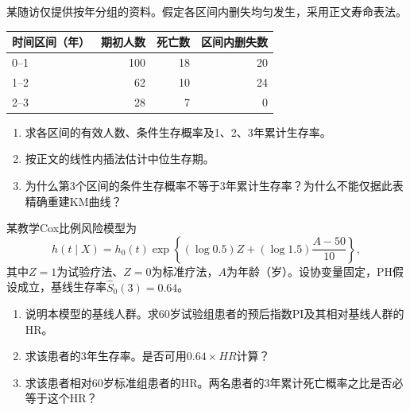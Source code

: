 \par\addvspace{8pt}\noindent\begin{minipage}{\linewidth}


某随访仅提供按年分组的资料。假定各区间内删失均匀发生，采用正文寿命表法。
\begin{center}\begin{tabular}{lrrr}\toprule
时间区间（年） & 期初人数 & 死亡数 & 区间内删失数\\\midrule
0--1 & 100 & 18 & 20\\
1--2 & 62 & 10 & 24\\
2--3 & 28 & 7 & 0\\\bottomrule
\end{tabular}\end{center}
\begin{enumerate}
\item 求各区间的有效人数、条件生存概率及1、2、3年累计生存率。
\item 按正文的线性内插法估计中位生存期。
\item 为什么第3个区间的条件生存概率不等于3年累计生存率？为什么不能仅据此表精确重建KM曲线？
\end{enumerate}


\end{minipage}\par\vspace{5pt}

\par\addvspace{8pt}\noindent\begin{minipage}{\linewidth}


某教学Cox比例风险模型为
\[h(t\mid X)=h_0(t)\exp\left\{(\log0.5)Z+(\log1.5)\frac{A-50}{10}\right\},\]
其中\(Z=1\)为试验疗法、\(Z=0\)为标准疗法，\(A\)为年龄（岁）。设协变量固定，PH假设成立，基线生存率\(\hat S_0(3)=0.64\)。
\begin{enumerate}
\item 说明本模型的基线人群。求60岁试验组患者的预后指数PI及其相对基线人群的HR。
\item 求该患者的3年生存率。是否可用\(0.64\times HR\)计算？
\item 求该患者相对60岁标准组患者的HR。两名患者的3年累计死亡概率之比是否必等于这个HR？
\end{enumerate}


\end{minipage}\par\vspace{5pt}

